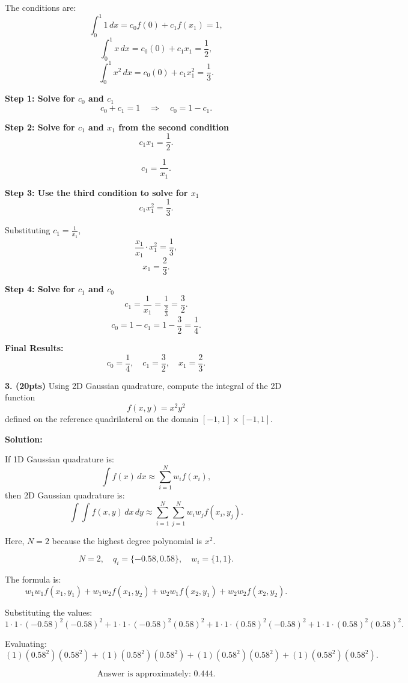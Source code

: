 \documentclass[11pt]{article}
\begin{document}
The conditions are:
\[
\int_0^1 1 \, dx = c_0 f(0) + c_1 f(x_1) = 1,
\]
\[
\int_0^1 x \, dx = c_0(0) + c_1 x_1 = \frac{1}{2},
\]
\[
\int_0^1 x^2 \, dx = c_0(0) + c_1 x_1^2 = \frac{1}{3}.
\]

\textbf{Step 1: Solve for \(c_0\) and \(c_1\)}
\[
c_0 + c_1 = 1 \quad \Rightarrow \quad c_0 = 1 - c_1.
\]

\textbf{Step 2: Solve for \(c_1\) and \(x_1\) from the second condition}
\[
c_1 x_1 = \frac{1}{2}.
\]

\[
c_1 = \frac{1}{x_1}.
\]

\textbf{Step 3: Use the third condition to solve for \(x_1\)}
\[
c_1 x_1^2 = \frac{1}{3}.
\]

Substituting \(c_1 = \frac{1}{x_1}\),
\[
\frac{x_1}{x_1} \cdot x_1^2 = \frac{1}{3},
\]
\[
x_1 = \frac{2}{3}.
\]

\textbf{Step 4: Solve for \(c_1\) and \(c_0\)}
\[
c_1 = \frac{1}{x_1} = \frac{1}{\frac{2}{3}} = \frac{3}{2}.
\]
\[
c_0 = 1 - c_1 = 1 - \frac{3}{2} = \frac{1}{4}.
\]

\textbf{Final Results:}
\[
c_0 = \frac{1}{4}, \quad c_1 = \frac{3}{2}, \quad x_1 = \frac{2}{3}.
\]

\textbf{3. (20pts)} Using 2D Gaussian quadrature, compute the integral of the 2D function 
\[
f(x, y) = x^2y^2
\]
defined on the reference quadrilateral on the domain \([-1, 1] \times [-1, 1]\).

\textbf{Solution:}

If 1D Gaussian quadrature is:
\[
\int f(x) \, dx \approx \sum_{i=1}^N w_i f(x_i),
\]
then 2D Gaussian quadrature is:
\[
\int \int f(x, y) \, dx \, dy \approx \sum_{i=1}^N \sum_{j=1}^N w_i w_j f(x_i, y_j).
\]

Here, \(N = 2\) because the highest degree polynomial is \(x^2\).

\[
N = 2, \quad q_i = \{-0.58, 0.58\}, \quad w_i = \{1, 1\}.
\]

The formula is:
\[
w_1 w_1 f(x_1, y_1) + w_1 w_2 f(x_1, y_2) + w_2 w_1 f(x_2, y_1) + w_2 w_2 f(x_2, y_2).
\]

Substituting the values:
\[
1 \cdot 1 \cdot (-0.58)^2 (-0.58)^2 + 1 \cdot 1 \cdot (-0.58)^2 (0.58)^2 + 1 \cdot 1 \cdot (0.58)^2 (-0.58)^2 + 1 \cdot 1 \cdot (0.58)^2 (0.58)^2.
\]

Evaluating:
\[
(1)(0.58^2)(0.58^2) + (1)(0.58^2)(0.58^2) + (1)(0.58^2)(0.58^2) + (1)(0.58^2)(0.58^2).
\]

\[
\text{Answer is approximately: } 0.444.
\]
\end{document}

